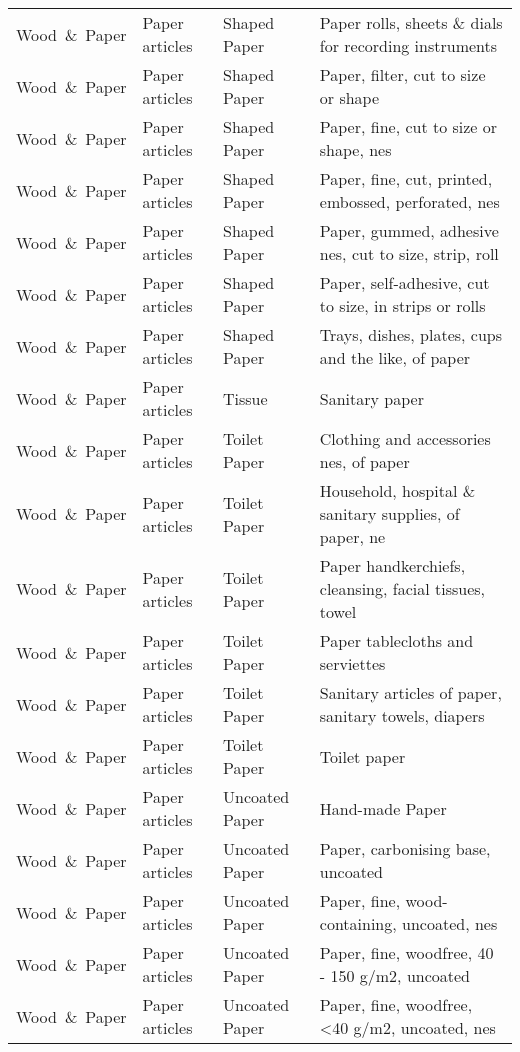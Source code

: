 \begin{appendices}
\begin{xltabular}{\textwidth}{|p{0.10\textwidth}|p{0.25\textwidth}|p{0.20\textwidth}|p{0.35\textwidth}|}
			Wood\ \&\ Paper & Paper articles & Shaped Paper & Paper rolls, sheets \& dials for recording instruments \\
			Wood\ \&\ Paper & Paper articles & Shaped Paper & Paper, filter, cut to size or shape \\
			Wood\ \&\ Paper & Paper articles & Shaped Paper & Paper, fine, cut to size or shape, nes \\
			Wood\ \&\ Paper & Paper articles & Shaped Paper & Paper, fine, cut, printed, embossed, perforated, nes \\
			Wood\ \&\ Paper & Paper articles & Shaped Paper & Paper, gummed, adhesive nes, cut to size, strip, roll \\
			Wood\ \&\ Paper & Paper articles & Shaped Paper & Paper, self-adhesive, cut to size, in strips or rolls \\
			Wood\ \&\ Paper & Paper articles & Shaped Paper & Trays, dishes, plates, cups and the like, of paper \\
			Wood\ \&\ Paper & Paper articles & Tissue & Sanitary paper \\
			Wood\ \&\ Paper & Paper articles & Toilet Paper & Clothing and accessories nes, of paper \\
			Wood\ \&\ Paper & Paper articles & Toilet Paper & Household, hospital \& sanitary supplies, of paper, ne \\
			Wood\ \&\ Paper & Paper articles & Toilet Paper & Paper handkerchiefs, cleansing, facial tissues, towel \\
			Wood\ \&\ Paper & Paper articles & Toilet Paper & Paper tablecloths and serviettes \\
			Wood\ \&\ Paper & Paper articles & Toilet Paper & Sanitary articles of paper, sanitary towels, diapers \\
			Wood\ \&\ Paper & Paper articles & Toilet Paper & Toilet paper \\
			Wood\ \&\ Paper & Paper articles & Uncoated Paper & Hand-made Paper \\
			Wood\ \&\ Paper & Paper articles & Uncoated Paper & Paper, carbonising base, uncoated \\
			Wood\ \&\ Paper & Paper articles & Uncoated Paper & Paper, fine, wood-containing, uncoated, nes \\
			Wood\ \&\ Paper & Paper articles & Uncoated Paper & Paper, fine, woodfree, 40 - 150 g/m2, uncoated \\
			Wood\ \&\ Paper & Paper articles & Uncoated Paper & Paper, fine, woodfree, <40 g/m2, uncoated, nes \\

\end{xltabular}
\end{appendices}
